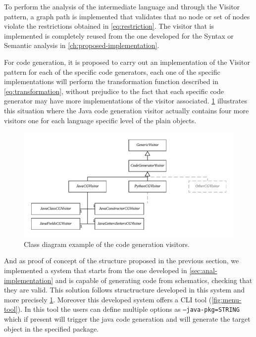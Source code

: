 To perform the analysis of the intermediate language and through the Visitor pattern,
a graph path is implemented that validates that no node or set of nodes
violate the restrictions obtained in \cref{eq:restriction}. The visitor that is implemented is
completely reused from the one developed for the Syntax or Semantic analysis in \cref{ch:proposed-implementation}.

For code generation, it is proposed to carry out an implementation of the Visitor pattern for each of the specific code generators,
each one of the specific implementations will perform the transformation function described in \cref{eq:transformation},
without prejudice to the fact that each specific code generator may have more implementations of the visitor associated.
\cref{fig:class-diagram-cg} illustrates this situation where the Java code generation visitor actually contains four more visitors
one for each language specific level of the plain objects.

\begin{figure}
    \includegraphics[width=\textwidth]{images/class-diagra-cg.pdf}
    \centering
	\caption[Class diagram example of the code generation visitors]{Class diagram example of the code generation visitors.}
    \label{fig:class-diagram-cg}
\end{figure}

And as proof of concept of the structure proposed in the previous section, we implemented a system that starts from the one
developed in \cref{sec:anal-implementation} and is capable of generating code from schematics, checking that they are valid.
This solution follows structructure developed in this system and more precisely \cref{fig:class-diagram-cg}. Moreover this
developed system offers a CLI tool (\cref{fig:menu-tool}). In this tool the users can define multiple options as \texttt{--java-pkg=STRING} which if
present will trigger the java code generation and will generate the target object in the specified package.

